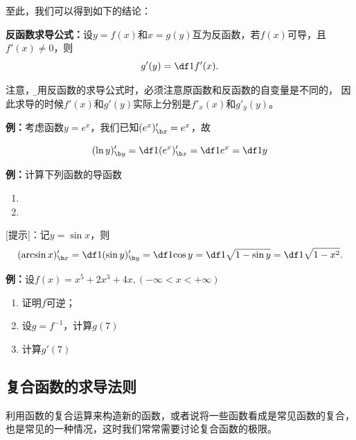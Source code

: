 至此，我们可以得到如下的结论：

\begin{thx}
	{\bf 反函数求导公式：}设$y=f(x)$和$x=g(y)$互为反函数，若$f(x)$可导，且$f'(x)\ne 0$，则
	$$g'(y)=\df1{f'(x)}.$$
\end{thx}
注意，{\b 使用反函数的求导公式时，必须注意原函数和反函数的自变量是不同的，
因此求导的时候$f'(x)$和$g'(y)$实际上分别是$f'_x(x)$和$g'_y(y)$。}

{\bf 例：}考虑函数$y=e^x$，我们已知$(e^x)'_{\b x}=e^x$，故
\begin{thx}
	$$(\ln y)'_{\b y}=\df1{(e^x)'_{\b x}}=\df1{e^x}=\df1y$$
\end{thx}

{\bf 例：}计算下列函数的导函数
\begin{enumerate}[(1)]
  \setlength{\itemindent}{1cm}
  \item {} 
  \item {}
\end{enumerate}

[提示]：记$y=\sin x$，则
$$(\arcsin x)'_{\b x}=\df1{(\sin y)'_{\b y}}=\df1{\cos y}
=\df1{\sqrt{1-\sin y}}=\df1{\sqrt{1-x^2}}.$$

{\bf 例：}设$f(x)=x^5+2x^3+4x,(-\infty<x<+\infty)$
\begin{enumerate}[(1)]
  \setlength{\itemindent}{1cm}
  \item 证明$f$可逆；
  \item 设$g=f^{-1}$，计算$g(7)$
  \item 计算$g'(7)$
\end{enumerate}

\subsection{复合函数的求导法则}

利用函数的复合运算来构造新的函数，或者说将一些函数看成是常见函数的复合，
也是常见的一种情况，这时我们常常需要讨论复合函数的极限。

